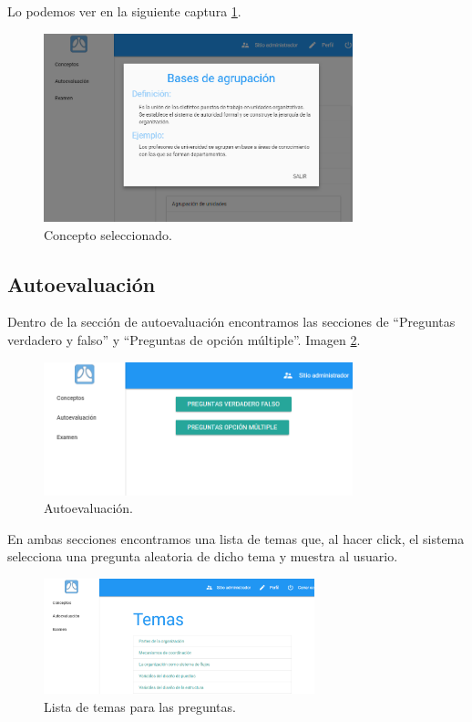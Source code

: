 \bigskip
Lo podemos ver en la siguiente captura \ref{fig:man_concepto_single}.


\begin{figure}[H]
 	\centering
 	\includegraphics[width=0.8\textwidth]{../images/manual/concepto_single.png}
    \caption{Concepto seleccionado.}
    \label{fig:man_concepto_single}
\end{figure}



\newpage
\subsection{Autoevaluación}

\bigskip
Dentro de la sección de autoevaluación encontramos las secciones de ``Preguntas verdadero y falso'' y ``Preguntas de opción múltiple''. Imagen \ref{fig:man_autoevaluacion}.

\begin{figure}[!H]
 	\centering
 	\includegraphics[width=0.8\textwidth]{../images/manual/autoevaluacion.png}
    \caption{Autoevaluación.}
    \label{fig:man_autoevaluacion}
\end{figure}



\bigskip
En ambas secciones encontramos una lista de temas que, al hacer click, el sistema selecciona una pregunta aleatoria de dicho tema y muestra al usuario.


\begin{figure}[!H]
 	\centering
 	\includegraphics[width=0.7\textwidth]{../images/manual/preguntas.png}
    \caption{Lista de temas para las preguntas.}
    \label{fig:man_preguntas}
\end{figure}


